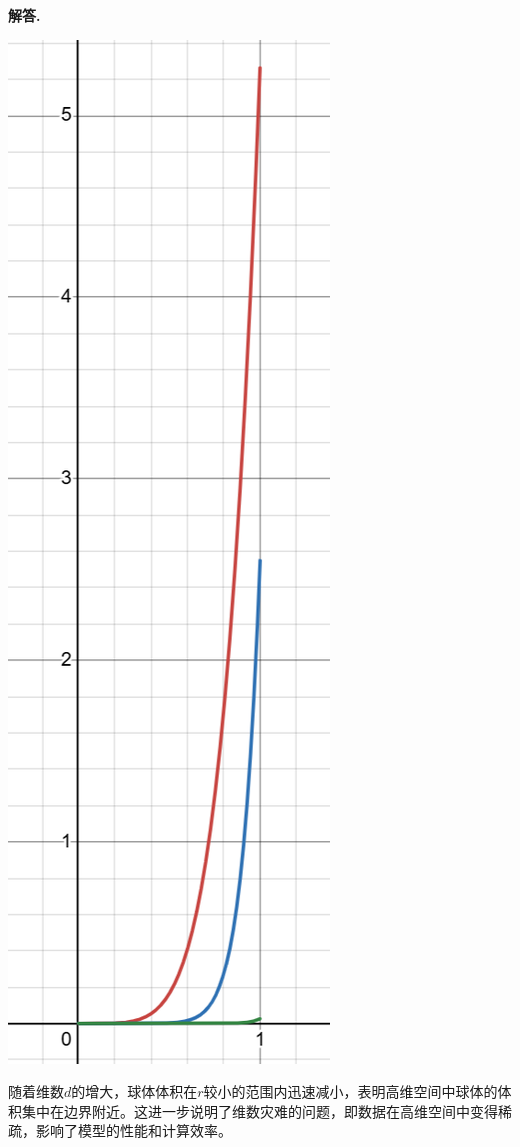 \documentclass[12pt, a4paper, oneside]{ctexart}
\newenvironment{solution}{\par\noindent\textbf{解答. }}{\par}
\begin{document}
\begin{solution}
\begin{center}
\begin{minipage}{0.48\textwidth}
        \includegraphics[width=\linewidth]{image-2.png}
    \end{minipage}
\end{center}

    随着维数$d$的增大，球体体积在$r$较小的范围内迅速减小，表明高维空间中球体的体积集中在边界附近。这进一步说明了维数灾难的问题，即数据在高维空间中变得稀疏，影响了模型的性能和计算效率。
\end{solution}
\end{document}
